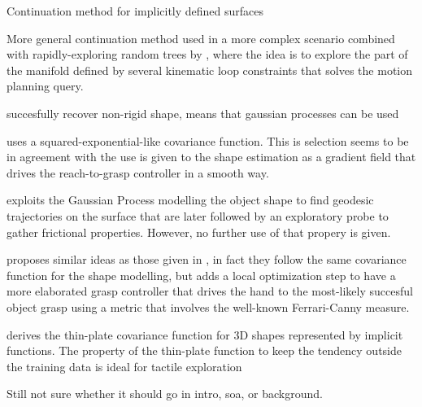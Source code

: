 Continuation method for implicitly defined surfaces \citet{Henderson1993COMPUTING}

More general continuation method used in a more complex scenario combined with rapidly-exploring random trees \citep{LaValle2011Motion} by \citet{Jaillet2013Path}, where the idea is to explore the part of the manifold defined by several kinematic loop constraints that solves the motion planning query.

\citet{Zhu2009Nonrigid} succesfully recover non-rigid shape, means that gaussian processes can be used

\citet{Dragiev2011Gaussian} uses a squared-exponential-like covariance function. This is selection seems to be in agreement with the use is given to the shape estimation as a gradient field that drives the reach-to-grasp controller in a smooth way.

\citet{Rosales2014Active} exploits the Gaussian Process modelling the object shape to find geodesic trajectories on the surface that are later followed by an exploratory probe to gather frictional properties. However, no further use of that propery is given.

\citet{Mahler2015Grasp} proposes similar ideas as those given in \citet{Dragiev2011Gaussian}, in fact they follow the same covariance function for the shape modelling, but adds a local optimization step to have a more elaborated grasp controller that drives the hand to the most-likely succesful object grasp using a metric that involves the well-known Ferrari-Canny measure.

\citet{Williams2007Gaussian} derives the thin-plate covariance function for 3D shapes represented by implicit functions. The property of the thin-plate function to keep the tendency outside the training data is ideal for tactile exploration~\citep[Fig.~2]{Williams2007Gaussian}

Still not sure whether it should go in intro, soa, or background.
\citet{Li2016Dexterous} 